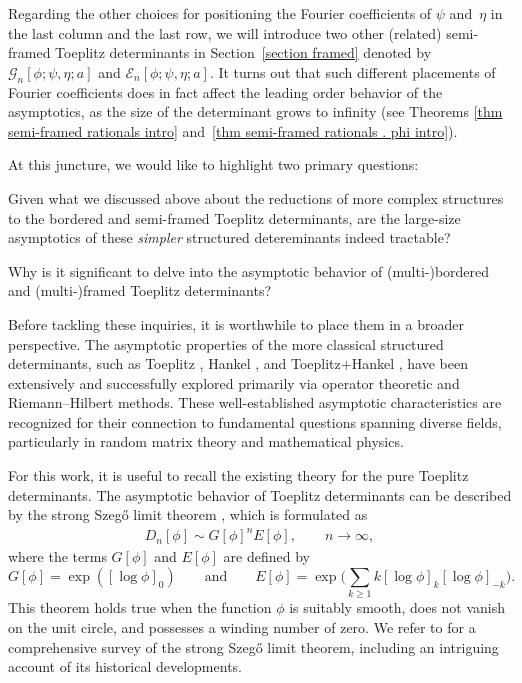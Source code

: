 \documentclass[pdftex]{sigma}
\numberwithin{equation}{section}
\begin{document}
\begin{Remark}
	Regarding the other choices for positioning the Fourier coefficients of $\psi$ and~$\eta$ in the last column and the last row, we will introduce two other (related) semi-framed Toeplitz determinants in Section~\ref{section framed} denoted by $\mathscr{G}_n[\phi;\psi,\eta;a]$ and $\mathscr{E}_n[\phi;\psi,\eta;a]$. It turns out that such different placements of Fourier coefficients does in fact affect the leading order behavior of the asymptotics, as the size of the determinant grows to infinity (see Theorems \ref{thm semi-framed rationals intro} and~\ref{thm semi-framed rationals . phi intro}).
\end{Remark}


At this juncture, we would like to highlight two primary questions:
\begin{Question}\label{q1}
 Given what we discussed above about the reductions of more complex structures to the bordered and semi-framed Toeplitz determinants, are the large-size asymptotics of these \textit{simpler} structured detereminants indeed tractable?
\end{Question}
	
\begin{Question}
\label{q2} Why is it significant to delve into the asymptotic behavior of (multi-)bordered and (mul\-ti-)framed Toeplitz determinants?
\end{Question}

Before tackling these inquiries, it is worthwhile to place them in a broader perspective. The asymptotic properties of the more classical structured determinants, such as Toeplitz \cite{BS1,BS,CIK,CK,DIK, Fahs, KV,Krasovsky1}, Hankel \cite{BGM,C,CG,DIK,ItsKrasovsky,Krasovsky}, and Toeplitz+Hankel \cite{BR,BE,BE2,Chelkak,GI}, have been extensively and successfully explored primarily via operator theoretic and Riemann--Hilbert methods. These well-established asymptotic characteristics are recognized for their connection to fundamental questions spanning diverse fields, particularly in random matrix theory and mathematical physics.

For this work, it is useful to recall the existing theory for the pure Toeplitz determinants. The asymptotic behavior of Toeplitz determinants can be described by the strong Szeg\H{o} limit theorem \cite{BS,Sz,WIDOMBlock}, which is formulated as
\begin{gather*}%
	D_{n}[\phi] \sim G[\phi]^{n} E[\phi], \qquad n\to\infty,
\end{gather*}
where the terms $G[\phi]$ and $E[\phi]$ are defined by
\begin{equation}\label{G and E}
	G[\phi] = \exp ([\log \phi]_{0}) \qquad \text{and}\qquad E[\phi] = \exp \bigg( \sum_{k \geq 1} k[\log \phi ]_{k}[\log \phi]_{-k} \bigg).
\end{equation}
This theorem holds true when the function $\phi$ is suitably smooth, does not vanish on the unit circle, and possesses a winding number of zero. We refer to \cite{DIK1} for a comprehensive survey of the strong Szeg\H{o} limit theorem, including an intriguing account of its historical developments.
\end{document}
